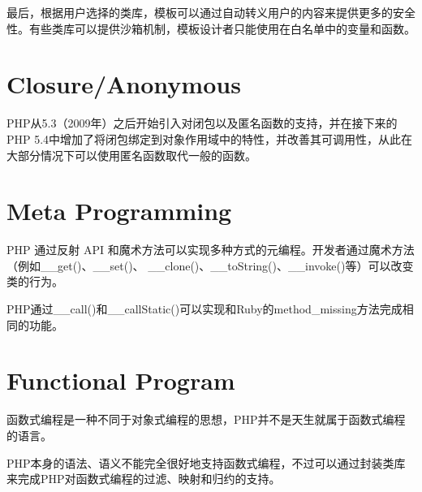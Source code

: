 最后，根据用户选择的类库，模板可以通过自动转义用户的内容来提供更多的安全性。有些类库可以提供沙箱机制，模板设计者只能使用在白名单中的变量和函数。





\section{Closure/Anonymous}

PHP从5.3（2009年）之后开始引入对闭包以及匿名函数的支持，并在接下来的PHP 5.4中增加了将闭包绑定到对象作用域中的特性，并改善其可调用性，从此在大部分情况下可以使用匿名函数取代一般的函数。

\section{Meta Programming}

PHP 通过反射 API 和魔术方法可以实现多种方式的元编程。开发者通过魔术方法（例如\_\_get()、\_\_set()、 \_\_clone()、\_\_toString()、\_\_invoke()等）可以改变类的行为。

PHP通过\_\_call()和\_\_callStatic()可以实现和Ruby的method\_missing方法完成相同的功能。

\section{Functional Program}


函数式编程是一种不同于对象式编程的思想，PHP并不是天生就属于函数式编程的语言。

PHP本身的语法、语义不能完全很好地支持函数式编程，不过可以通过封装类库来完成PHP对函数式编程的过滤、映射和归约的支持。


